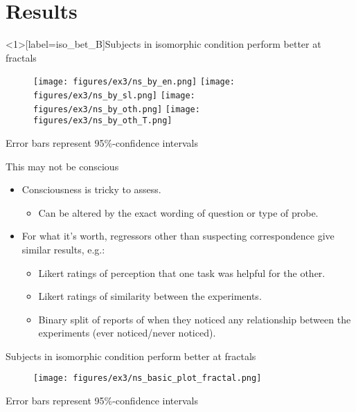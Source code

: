 \documentclass{beamer}
\begin{document}
\section{Results}


\begin{frame}<1>[label=iso_bet_B]{Subjects in isomorphic condition perform better at fractals}
\begin{figure}
\centering
{} {
\texttt{[image: figures/ex3/ns\_by\_en.png]}
} {
\texttt{[image: figures/ex3/ns\_by\_sl.png]}
}  {
\texttt{[image: figures/ex3/ns\_by\_oth.png]}
}  {
\texttt{[image: figures/ex3/ns\_by\_oth\_T.png]}
}
\end{figure}
{\scriptsize Error bars represent 95\%-confidence intervals}
\end{frame}

\begin{frame}{This may not be conscious}
\begin{itemize}
\item Consciousness is tricky to assess.
    \begin{itemize}
    \item<2-> Can be altered by the exact wording of question or type of probe.
    \end{itemize}
\item<3-> For what it's worth, regressors other than suspecting correspondence give similar results, e.g.:
    \begin{itemize}
    \item<4-> Likert ratings of perception that one task was helpful for the other. 
    \item<5-> Likert ratings of similarity between the experiments.
    \item<6-> Binary split of reports of when they noticed any relationship between the experiments (ever noticed/never noticed).
    \end{itemize}
\end{itemize}
\end{frame}

\begin{frame}{Subjects in isomorphic condition perform better at fractals}
\begin{figure}
\centering
\texttt{[image: figures/ex3/ns\_basic\_plot\_fractal.png]}
\end{figure}
{\scriptsize Error bars represent 95\%-confidence intervals}
\end{frame}
\end{document}
